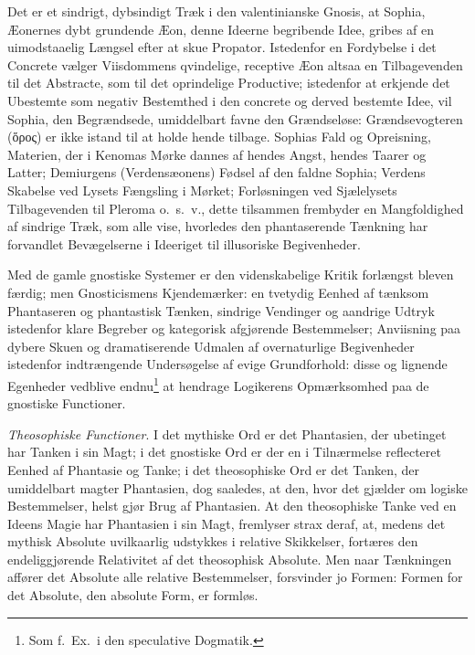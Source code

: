 \documentclass[12pt]{book}
\newcommand{\opage}[1]{\marginnote{\footnotesize\textit{[#1]}}}
\begin{document}
Det er et sindrigt, dybsindigt Træk i den valentinianske Gnosis,
at Sophia, Æonernes dybt grundende Æon, denne Ideerne begribende
Idee, gribes af en uimodstaaelig Længsel efter at skue
Propator. Istedenfor en Fordybelse i det Concrete vælger
Viisdommens qvindelige, receptive Æon altsaa en Tilbagevenden
til det Abstracte, som til det oprindelige Productive;
istedenfor at erkjende det Ubestemte som negativ Bestemthed i
den concrete og derved bestemte Idee, vil Sophia, den Begrændsede,
umiddelbart favne den Grændseløse: Grændsevogteren
(ὅρος) er ikke istand til at holde hende tilbage. Sophias
Fald og Opreisning, Materien, der i Kenomas Mørke dannes
af hendes Angst, hendes Taarer og Latter; Demiurgens
(Verdensæonens) Fødsel af den faldne Sophia; Verdens Skabelse
ved Lysets Fængsling i Mørket; Forløsningen ved Sjælelysets
Tilbagevenden til Pleroma o.\ s.\ v., dette tilsammen
frembyder en Mangfoldighed af sindrige Træk, som alle vise,
hvorledes den phantaserende Tænkning har forvandlet Bevægelserne
i Ideeriget til illusoriske Begivenheder.

Med de gamle gnostiske Systemer er den videnskabelige
Kritik forlængst bleven færdig; men Gnosticismens Kjendemærker:
en tvetydig Eenhed af tænksom Phantaseren og phantastisk
Tænken, sindrige Vendinger og aandrige Udtryk istedenfor
klare Begreber og kategorisk afgjørende Bestemmelser;
Anviisning paa dybere Skuen og dramatiserende Udmalen af
overnaturlige Begivenheder istedenfor indtrængende Undersøgelse
af evige Grundforhold: disse og lignende Egenheder vedblive
\opage{86}endnu\footnote{Som f.\ Ex.\ i den speculative Dogmatik.} %
at hendrage Logikerens Opmærksomhed paa de gnostiske
Functioner.

\emph{Theosophiske Functioner}. I det mythiske Ord er
det Phantasien, der ubetinget har Tanken i sin Magt; i det gnostiske
Ord er der en i Tilnærmelse reflecteret Eenhed af Phantasie
og Tanke; i det theosophiske Ord er det Tanken, der
umiddelbart magter Phantasien, dog saaledes, at den, hvor det
gjælder om logiske Bestemmelser, helst gjør Brug af Phantasien.
At den theosophiske Tanke ved en Ideens Magie har
Phantasien i sin Magt, fremlyser strax deraf, at, medens det
mythisk Absolute uvilkaarlig udstykkes i relative Skikkelser,
fortæres den endeliggjørende Relativitet af det theosophisk Absolute.
Men naar Tænkningen affører det Absolute alle relative
Bestemmelser, forsvinder jo Formen: Formen for det
Absolute, den absolute Form, er formløs.
\end{document}
